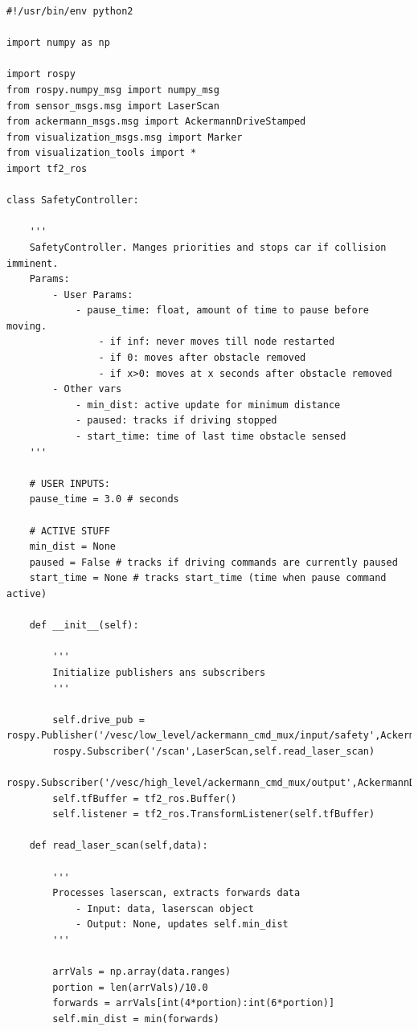 \documentclass{article}
\begin{document}
{\footnotesize
\begin{verbatim}
#!/usr/bin/env python2

import numpy as np

import rospy
from rospy.numpy_msg import numpy_msg
from sensor_msgs.msg import LaserScan
from ackermann_msgs.msg import AckermannDriveStamped
from visualization_msgs.msg import Marker
from visualization_tools import *
import tf2_ros

class SafetyController:
    
    '''
    SafetyController. Manges priorities and stops car if collision imminent. 
    Params:
        - User Params:
            - pause_time: float, amount of time to pause before moving.
                - if inf: never moves till node restarted
                - if 0: moves after obstacle removed
                - if x>0: moves at x seconds after obstacle removed
        - Other vars
            - min_dist: active update for minimum distance
            - paused: tracks if driving stopped
            - start_time: time of last time obstacle sensed
    '''

    # USER INPUTS:
    pause_time = 3.0 # seconds

    # ACTIVE STUFF
    min_dist = None 
    paused = False # tracks if driving commands are currently paused
    start_time = None # tracks start_time (time when pause command active)

    def __init__(self):
        
        '''
        Initialize publishers ans subscribers
        '''
        
        self.drive_pub = rospy.Publisher('/vesc/low_level/ackermann_cmd_mux/input/safety',AckermannDriveStamped,queue_size=10)
        rospy.Subscriber('/scan',LaserScan,self.read_laser_scan)
        rospy.Subscriber('/vesc/high_level/ackermann_cmd_mux/output',AckermannDriveStamped,self.check_drive_command)
        self.tfBuffer = tf2_ros.Buffer()
        self.listener = tf2_ros.TransformListener(self.tfBuffer)

    def read_laser_scan(self,data):

        '''
        Processes laserscan, extracts forwards data
            - Input: data, laserscan object
            - Output: None, updates self.min_dist 
        '''

        arrVals = np.array(data.ranges)
        portion = len(arrVals)/10.0
        forwards = arrVals[int(4*portion):int(6*portion)]
        self.min_dist = min(forwards)
    

\end{verbatim}}
\end{document}
